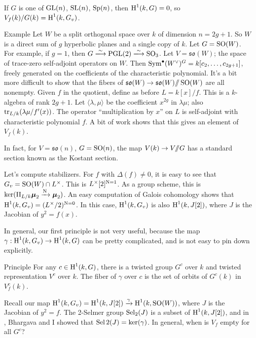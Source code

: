 If $G$ is one of $\operatorname{GL}(n)$, $\operatorname{SL}(n)$, $\operatorname{Sp}(n)$, 
then $\operatorname{H}^1(k,G)=0$, so $V_f(k)/G(k) = \operatorname{H}^1(k,G_v)$. 

\begin{enonce}[remark]{Example}
Let $W$ be a split orthogonal space over $k$ of dimension $n=2 g+1$. So $W$ 
is a direct sum of $g$ hyperbolic planes and a single copy of $k$. Let 
$G=\operatorname{SO}(W)$. For example, if 
$g=1$, then $G\iso \projectivegenerallinear(2)\iso \specialorthogonal_3$. 
Let $V=\mathfrak{so}(W)$; the space of trace-zero self-adjoint operators on 
$W$. Then 
$\operatorname{Sym}^\bullet(W^\vee)^G=k[c_2,\dots,c_{2g+1}]$, freely generated on 
the coefficients of the characteristic polynomial. It's a bit more 
difficult to show that the fibers of 
$\mathfrak{so}(W) \to \mathfrak{so}(W)/\!\!/ \operatorname{SO}(W)$ are all 
nonempty. Given $f$ in the quotient, define as before $L=k[x]/f$. This is a 
$k$-algebra of rank $2 g+1$. Let $\langle\lambda,\mu\rangle$ be the coefficient 
$x^{2 g}$ in $\lambda\mu$; also $\operatorname{tr}_{L/k}(\lambda\mu/f'(x))$. The 
operator ``multiplication by $x$'' on $L$ is self-adjoint with characteristic 
polynomial $f$. A bit of work shows that this gives an element of $V_f(k)$. 
\end{enonce}

In fact, for $V=\mathfrak{so}(n)$, $G=\operatorname{SO}(n)$, the map 
$V(k) \to V/\!\!/ G$ has a standard section known as the Kostant section. 

Let's compute stabilizers. For $f$ with $\Delta(f)\ne 0$, it is easy to see 
that $G_v=\operatorname{SO}(W)\cap L^\times$. This is 
$L^\times[2]^{\operatorname{N}=1}$. As a group scheme, this is 
$\ker(\Pi_{L/k}\boldsymbol\mu_2 \xrightarrow{\operatorname{N}{}}\boldsymbol\mu_2)$. 
An easy computation of Galois cohomology shows that 
$\operatorname{H}^1(k,G_v) = (L^\times/2)^{\operatorname{N}=0}$. In this case, $\operatorname{H}^1(k, G_v)$ is also 
$\operatorname{H}^1(k,J[2])$, where $J$ is the Jacobian of $y^2=f(x)$. 

In general, our first principle is not very useful, because the map 
$\gamma:\operatorname{H}^1(k,G_v) \to \operatorname{H}^1(k,G)$ can be pretty complicated, and is not easy to 
pin down explicitly. 

\begin{enonce}{Principle}
For any $c\in \operatorname{H}^1(k,G)$, there is a twisted group $G^c$ over $k$ and twisted 
representation $V^c$ over $k$. The fiber of $\gamma$ over $c$ is the set of 
orbits of $G^c(k)$ in $V_f^c(k)$. 
\end{enonce}

Recall our map 
$\operatorname{H}^1(k,G_v) = \operatorname{H}^1(k,J[2]) \xrightarrow\gamma \operatorname{H}^1(k,\operatorname{SO}(W))$, 
where $J$ is the Jacobian of $y^2=f$. The 2-Selmer group $\operatorname{Sel}_2(J)$ is a 
subset of $\operatorname{H}^1(k,J[2])$, and in \cite{bg13}, Bhargava and I showed that 
$\operatorname{Sel}2(J) = \ker(\gamma)$. In general, when is $V_f$ empty for all 
$G^c$?

